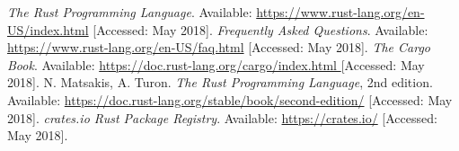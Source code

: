 \documentclass[a4paper, 11pt]{article}
\begin{document}
\begin{thebibliography}{9}
 \emph{The Rust Programming Language}. Available: \url{https://www.rust-lang.org/en-US/index.html} [Accessed: May 2018].
 \emph{Frequently Asked Questions}. Available: \url{https://www.rust-lang.org/en-US/faq.html} [Accessed: May 2018].
 \emph{The Cargo Book}. Available: \url{https://doc.rust-lang.org/cargo/index.html }[Accessed: May 2018].
 N. Matsakis, A. Turon. \emph{The Rust Programming Language}, 2nd edition. Available: \url{https://doc.rust-lang.org/stable/book/second-edition/} [Accessed: May 2018].
 \emph{crates.io Rust Package Registry}. Available: \url{https://crates.io/} [Accessed: May 2018].
\end{thebibliography}
\end{document}
